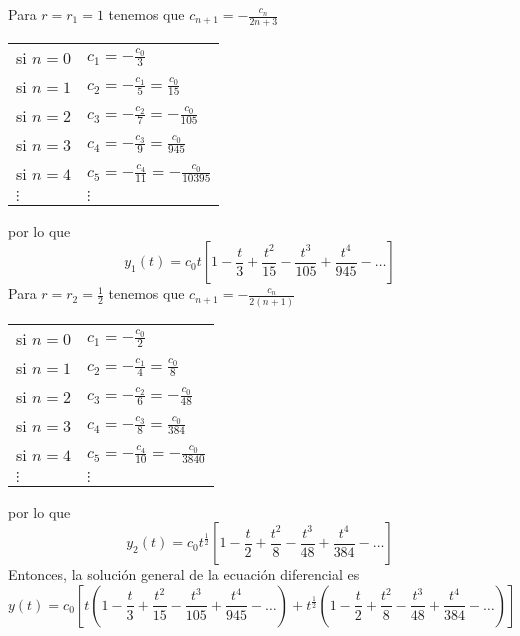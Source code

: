 \documentclass{article}
\begin{document}
\begin{enumerate}
{\[            \]
            Para $r=r_1=1$ tenemos que $c_{n+1}=-\frac{c_n}{2n+3}$
            \begin{center}
                \begin{tabular}{ll}
                    si $n=0$ & $c_1=-\frac{c_0}{3}$ \\
                    si $n=1$ & $c_2=-\frac{c_1}{5}=\frac{c_0}{15}$ \\
                    si $n=2$ & $c_3=-\frac{c_2}{7}=-\frac{c_0}{105}$ \\
                    si $n=3$ & $c_4=-\frac{c_3}{9}=\frac{c_0}{945}$ \\
                    si $n=4$ & $c_5=-\frac{c_4}{11}=-\frac{c_0}{10395}$ \\
                    $\vdots$ & $\vdots$
                \end{tabular}
            \end{center}
            por lo que
            \[
                y_1(t)=c_0t\left[
                    1-\frac{t}{3}+\frac{t^2}{15}-\frac{t^3}{105}+\frac{t^4}{945}-\ldots
                \right]
            \]
            Para $r=r_2=\frac{1}{2}$ tenemos que $c_{n+1}=-\frac{c_n}{2(n+1)}$
            \begin{center}
                \begin{tabular}{ll}
                    si $n=0$ & $c_1=-\frac{c_0}{2}$ \\
                    si $n=1$ & $c_2=-\frac{c_1}{4}=\frac{c_0}{8}$ \\
                    si $n=2$ & $c_3=-\frac{c_2}{6}=-\frac{c_0}{48}$ \\
                    si $n=3$ & $c_4=-\frac{c_3}{8}=\frac{c_0}{384}$ \\
                    si $n=4$ & $c_5=-\frac{c_4}{10}=-\frac{c_0}{3840}$ \\
                    $\vdots$ & $\vdots$
                \end{tabular}
            \end{center}
            por lo que
            \[
                y_2(t)=c_0t^{\frac{1}{2}}\left[
                    1-\frac{t}{2}+\frac{t^2}{8}-\frac{t^3}{48}+\frac{t^4}{384}-\ldots
                \right]
            \]
            Entonces, la solución general de la ecuación diferencial es
            \[
                y(t)=c_0\left[
                    t\left(1-\frac{t}{3}+\frac{t^2}{15}-\frac{t^3}{105}+\frac{t^4}{945}-\ldots\right)
                    +t^{\frac{1}{2}}\left(1-\frac{t}{2}+\frac{t^2}{8}-\frac{t^3}{48}+\frac{t^4}{384}-\ldots\right)
                \right]
            \]
        }


\end{enumerate}
\end{document}
